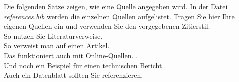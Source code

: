 \documentclass[praktikum,german]{hgbthesis}
\begin{document}
\vspace{1cm}
\noindent Die folgenden Sätze zeigen, wie eine Quelle angegeben wird. In der Datei \textit{references.bib} werden die einzelnen Quellen
aufgelistet. Tragen Sie hier Ihre eigenen Quellen ein und verwenden Sie den vorgegebenen Zitierstil.\\

\noindent So nutzen Sie Literaturverweise. \cite{HBuch16} \\
So verweist man auf einen Artikel. \cite{MMuster23} \\
Das funktioniert auch mit Online-Quellen. \cite{onlineJohn}.\\
Und noch ein Beispiel für einen technischen Bericht. \cite{techSusi}\\
Auch ein Datenblatt sollten Sie referenzieren. \cite{datenblatt}




\printbibliography[heading=bibintoc]
\end{document}
